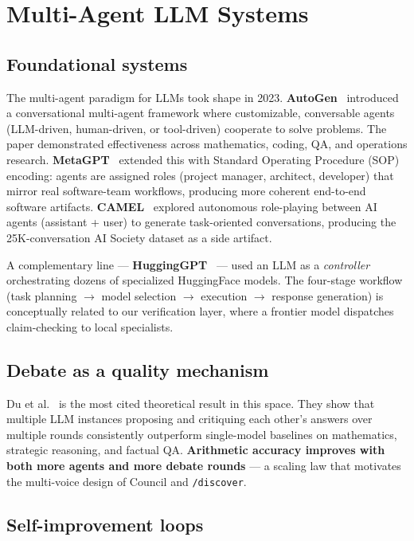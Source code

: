 \documentclass[11pt]{article}
\begin{document}
\section{Multi-Agent LLM Systems}

\subsection{Foundational systems}

The multi-agent paradigm for LLMs took shape in 2023. \textbf{AutoGen}~\cite{wu2023autogen} introduced a conversational multi-agent framework where customizable, conversable agents (LLM-driven, human-driven, or tool-driven) cooperate to solve problems. The paper demonstrated effectiveness across mathematics, coding, QA, and operations research. \textbf{MetaGPT}~\cite{hong2023metagpt} extended this with Standard Operating Procedure (SOP) encoding: agents are assigned roles (project manager, architect, developer) that mirror real software-team workflows, producing more coherent end-to-end software artifacts. \textbf{CAMEL}~\cite{li2023camel} explored autonomous role-playing between AI agents (assistant + user) to generate task-oriented conversations, producing the 25K-conversation AI Society dataset as a side artifact.

A complementary line --- \textbf{HuggingGPT}~\cite{shen2023hugginggpt} --- used an LLM as a \emph{controller} orchestrating dozens of specialized HuggingFace models. The four-stage workflow (task planning $\rightarrow$ model selection $\rightarrow$ execution $\rightarrow$ response generation) is conceptually related to our verification layer, where a frontier model dispatches claim-checking to local specialists.

\subsection{Debate as a quality mechanism}

Du et al.~\cite{du2023multiagent} is the most cited theoretical result in this space. They show that multiple LLM instances proposing and critiquing each other's answers over multiple rounds consistently outperform single-model baselines on mathematics, strategic reasoning, and factual QA. \textbf{Arithmetic accuracy improves with both more agents and more debate rounds} --- a scaling law that motivates the multi-voice design of Council and \texttt{/discover}.

\subsection{Self-improvement loops}
\end{document}
